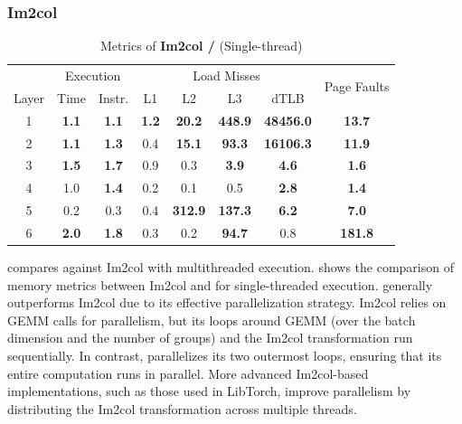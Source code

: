 \subsubsection{Im2col}
\label{sec:eval-im2col}

\begin{table}[t]
    \caption{Metrics of \textbf{Im2col / \algname} (Single-thread)}
    \label{tab:im2col-perf}
    \small
    \setlength{\tabcolsep}{3pt} %
    \centering
    \begin{tabular}{c|cc|cccc|c}
        & \multicolumn{2}{c|}{Execution} & \multicolumn{4}{c|}{Load Misses} & \multirow{2}{*}{Page Faults} \\
        Layer & Time & Instr. & L1 & L2 & L3 & dTLB & \\ \hline
        1 & \textbf{1.1} & \textbf{1.1} & \textbf{1.2} & \textbf{20.2} & \textbf{448.9} & \textbf{48456.0} & \textbf{13.7} \\
        2 & \textbf{1.1} & \textbf{1.3} & 0.4 & \textbf{15.1} & \textbf{93.3} & \textbf{16106.3} & \textbf{11.9} \\
        3 & \textbf{1.5} & \textbf{1.7} & 0.9 & 0.3 & \textbf{3.9} & \textbf{4.6} & \textbf{1.6} \\
        4 & 1.0 & \textbf{1.4} & 0.2 & 0.1 & 0.5 & \textbf{2.8} & \textbf{1.4} \\
        5 & 0.2 & 0.3 & 0.4 & \textbf{312.9} & \textbf{137.3} & \textbf{6.2} & \textbf{7.0} \\
        6 & \textbf{2.0} & \textbf{1.8} & 0.3 & 0.2 & \textbf{94.7} & 0.8 & \textbf{181.8} \\
    \end{tabular}
\end{table}

 compares \algname against Im2col with multithreaded execution.
 shows the comparison of memory metrics between Im2col and \algname for single-threaded execution.
\algname generally outperforms Im2col due to its effective parallelization strategy.
Im2col relies on GEMM calls for parallelism, but its loops around GEMM (over the batch dimension and the number of groups) and the Im2col transformation run sequentially.
In contrast, \algname parallelizes its two outermost loops, ensuring that its entire computation runs in parallel. 
More advanced Im2col-based implementations, such as those used in LibTorch, improve parallelism by distributing the Im2col transformation across multiple threads.

